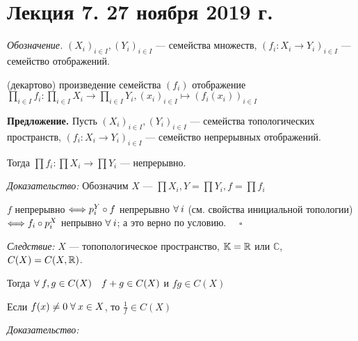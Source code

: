 \documentclass[../../main.tex]{subfiles}
\begin{document}
\section{Лекция 7. 27 ноября 2019 г.}

\textit{Обозначение.} $(X_i)_{i \in I}, (Y_i)_{i \in I}$ — семейства множеств, $\left( f_i \colon X_i \to Y_i \right)_{i \in I}$ — семейство отображений.

 (декартово) произведение семейства $(f_i)$ отображение $\prod_{i \in I} f_i \colon \prod_{i \in I} X_i \to \prod_{i \in I}Y_i, (x_i)_{i \in I} \mapsto \left( f_i(x_i) \right)_{i \in I}$

\textbf{Предложение.} Пусть $(X_i)_{i \in I}, (Y_i)_{i \in I}$ — семейства топологических пространств, $( f_i \colon X_i \to Y_i)_{i \in I}$ — семейство непрерывных отображений.

Тогда $\prod f_i \colon \prod X_i \to \prod Y_i$ — непрерывно.

\textit{Доказательство:} Обозначим $X$ — $\prod X_i, Y = \prod Y_i, f = \prod f_i$

\begin{minipage}{0.20\linewidth}

\end{minipage}
\begin{minipage}{0.8\linewidth}
$f$ непрерывно $\Longleftrightarrow p^Y_i \circ f$ непрерывно $\forall\: i$ (см. свойства инициальной топологии) $\Longleftrightarrow f_i \circ p^X_i$ непрывно $\forall\: i$; а это верно по условию. $\quad \square$
\end{minipage}

\textit{Следствие:} $X$ — топопологическое пространство, $\mathbb{K} = \mathbb{R}$ или $\mathbb{C}$, $C (X) = C(X, \mathbb{R})$.

Тогда $\forall\: f,g \in C(X) \quad f + g \in C(X)$ и $fg \in C(X)$

Если $f(x) \neq 0 \; \forall\: x \in X$, то $\frac 1 f \in C(X)$

\textit{Доказательство:}

\end{document}
